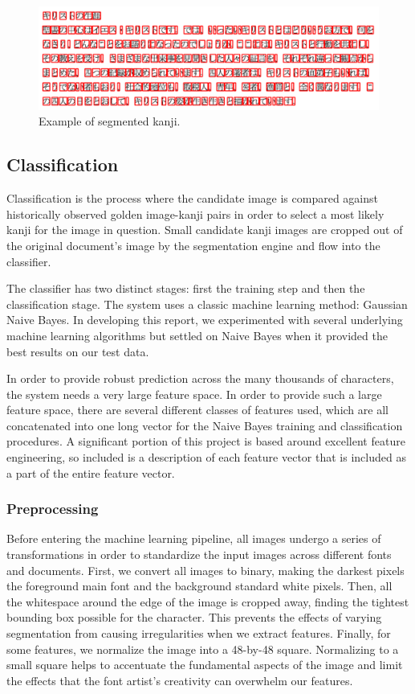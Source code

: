 \documentclass[10pt,twocolumn,letterpaper]{article}
\begin{document}
\begin{figure}[t]
    \centering
    \includegraphics[width=\columnwidth]{../segmented.png}
    \caption{Example of segmented kanji.}
\end{figure}

\subsection{Classification}
Classification is the process where the candidate image is compared against historically observed golden image-kanji pairs in order to select a most likely kanji for the image in question. Small candidate kanji images are cropped out of the original document’s image by the segmentation engine and flow into the classifier.

The classifier has two distinct stages: first the training step and then the classification stage. The system uses a classic machine learning method: Gaussian Naive Bayes. In developing this report, we experimented with several underlying machine learning algorithms but settled on Naive Bayes when it provided the best results on our test data.

In order to provide robust prediction across the many thousands of characters, the system needs a very large feature space. In order to provide such a large feature space, there are several different classes of features used, which are all concatenated into one long vector for the Naive Bayes training and classification procedures. A significant portion of this project is based around excellent feature engineering, so included is a description of each feature vector that is included as a part of the entire feature vector.

\subsubsection{Preprocessing}
Before entering the machine learning pipeline, all images undergo a series of transformations in order to standardize the input images across different fonts and documents. First, we convert all images to binary, making the darkest pixels the foreground main font and the background standard white pixels. Then, all the whitespace around the edge of the image is cropped away, finding the tightest bounding box possible for the character. This prevents the effects of varying segmentation from causing irregularities when we extract features. Finally, for some features, we normalize the image into a 48-by-48 square. Normalizing to a small square helps to accentuate the fundamental aspects of the image and limit the effects that the font artist’s creativity can overwhelm our features.
\end{document}

